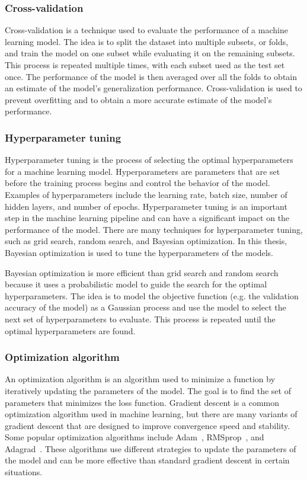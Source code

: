 \documentclass{article}
\begin{document}
\subsubsection{Cross-validation}
Cross-validation is a technique used to evaluate the performance of a machine learning model. The idea is to split the dataset into multiple subsets, or folds, and train the model on one subset while evaluating it on the remaining subsets. This process is repeated multiple times, with each subset used as the test set once. The performance of the model is then averaged over all the folds to obtain an estimate of the model's generalization performance. Cross-validation is used to prevent overfitting and to obtain a more accurate estimate of the model's performance.

\subsubsection{Hyperparameter tuning}
Hyperparameter tuning is the process of selecting the optimal hyperparameters for a machine learning model. Hyperparameters are parameters that are set before the training process begins and control the behavior of the model. Examples of hyperparameters include the learning rate, batch size, number of hidden layers, and number of epochs. Hyperparameter tuning is an important step in the machine learning pipeline and can have a significant impact on the performance of the model. There are many techniques for hyperparameter tuning, such as grid search, random search, and Bayesian optimization. In this thesis, Bayesian optimization is used to tune the hyperparameters of the models.

Bayesian optimization is more efficient than grid search and random search because it uses a probabilistic model to guide the search for the optimal hyperparameters. The idea is to model the objective function (e.g. the validation accuracy of the model) as a Gaussian process and use the model to select the next set of hyperparameters to evaluate. This process is repeated until the optimal hyperparameters are found.

\subsubsection{Optimization algorithm}
An optimization algorithm is an algorithm used to minimize a function by iteratively updating the parameters of the model. The goal is to find the set of parameters that minimizes the loss function. Gradient descent is a common optimization algorithm used in machine learning, but there are many variants of gradient descent that are designed to improve convergence speed and stability. Some popular optimization algorithms include Adam~\cite{kingma2014adam}, RMSprop~\cite{graves2013generating}, and Adagrad~\cite{duchi2011adaptive}. These algorithms use different strategies to update the parameters of the model and can be more effective than standard gradient descent in certain situations. 
\end{document}
